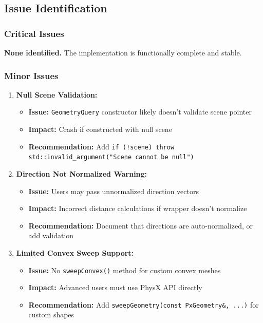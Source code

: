 
\subsection{Issue Identification}

\subsubsection{Critical Issues}

\textbf{None identified.} The implementation is functionally complete and stable.

\subsubsection{Minor Issues}

\begin{enumerate}
    \item \textbf{Null Scene Validation:}
    \begin{itemize}
        \item \textbf{Issue:} \texttt{GeometryQuery} constructor likely doesn't validate scene pointer
        \item \textbf{Impact:} Crash if constructed with null scene
        \item \textbf{Recommendation:} Add \texttt{if (!scene) throw std::invalid\_argument("Scene cannot be null")}
    \end{itemize}

    \item \textbf{Direction Not Normalized Warning:}
    \begin{itemize}
        \item \textbf{Issue:} Users may pass unnormalized direction vectors
        \item \textbf{Impact:} Incorrect distance calculations if wrapper doesn't normalize
        \item \textbf{Recommendation:} Document that directions are auto-normalized, or add validation
    \end{itemize}

    \item \textbf{Limited Convex Sweep Support:}
    \begin{itemize}
        \item \textbf{Issue:} No \texttt{sweepConvex()} method for custom convex meshes
        \item \textbf{Impact:} Advanced users must use PhysX API directly
        \item \textbf{Recommendation:} Add \texttt{sweepGeometry(const PxGeometry\&, ...)} for custom shapes
    \end{itemize}
\end{enumerate}

